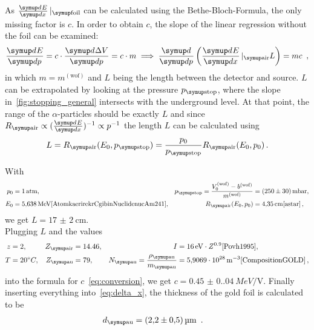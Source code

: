 As $\dif{E}{x}|_\T{foil}$ can be calculated using the Bethe-Bloch-Formula, the only missing factor is $c$. 
In order to obtain $c$, the slope of the linear regression without the foil can be examined:
\begin{align}
    \dif{E}{p} = c \cdot \dif{\Delta V}{p} = c \cdot m \implies \dif{}{p} \left(\dif{E}{x}|_\T{air} L \right) = mc~\label{eq:conversion} \, ,
\end{align}
in which $m = m^{\mathrm{(wof)}}$ and $L$ being the length between the detector and source.
$L$ can be extrapolated by looking at the pressure $p_\T{stop}$, where the slope in~\autoref{fig:stopping_general} intersects with the underground level. 
At that point, the range of the $\alpha$-particles should be exactly $L$ and since $R_\T{air} \propto (\dif{E}{x})^{-1} \propto p^{-1}$ the length $L$ can be calculated using
\begin{align}
    L = R_\T{air}(E_0, p_\T{stop}) = \frac{p_0}{p_\T{stop}} R_\T{air}(E_0, p_0) \, .
\end{align}

With 
\begin{align}
    p_0 &= \qty{1}{atm}, & p_\T{stop} = \frac{V_0^{\mathrm{(wof)}} - b^{\mathrm{(wof)}}}{m^{\mathrm{(wof)}}} &= \qty{250(30)}{\milli bar}, \\
    E_0 &= \qty{5.638}{MeV}\text{\cite{AtomkaerirekrCgibinNuclidenucAm241}}, & R_\T{air}(E_0, p_0) &= \qty{4.35}{\centi\meter}\text{\cite{astar}} \, ,
\end{align}
we get $L = \qty{17(2)}{\centi\meter}$. \\

Plugging $L$ and the values
\begin{align}
    z &= 2, & Z_\T{air} &= 14.46, & I &= \qty{16}{eV} \cdot Z^{0.9}\text{\cite{Povh1995}}, \\
    T &= 20^{\circ} C, & Z_\T{au} &= 79, & N_\T{au} = \frac{\rho_\T{au}}{m_\T{au}} &= \qty{5.9069e28}{m^{-3}}\text{\cite{CompositionGOLD}} \, ,
\end{align}
into the formula for $c$~\eqref{eq:conversion}, we get $c = \qty{0.45(0.04)}{MeV\per\volt}$.
Finally inserting everything into~\eqref{eq:delta_x}, the thickness of the gold foil is calculated to be 
\begin{align}
    d_\T{au} &= \qty{2.2(0.5)}{\micro\meter}~\label{eq:d_exp} \, .
\end{align}

\clearpage